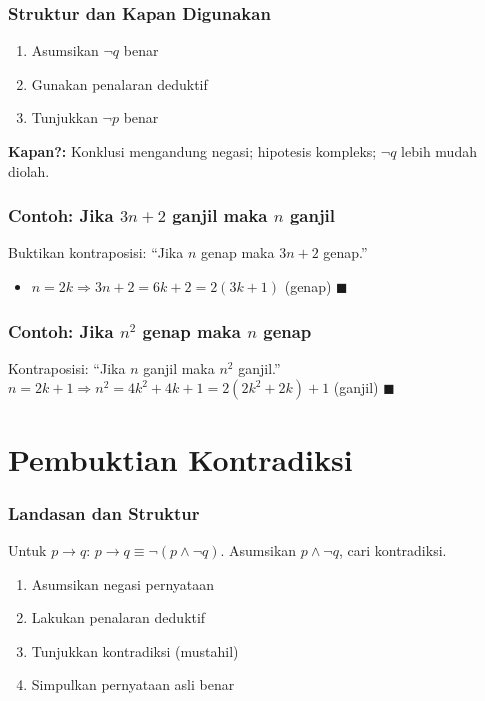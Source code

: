 \documentclass[handout]{beamer}
\theoremstyle{definition}
\theoremstyle{example}
\begin{document}
\begin{frame}
\frametitle{Struktur dan Kapan Digunakan}
\begin{enumerate}
  \item Asumsikan $\neg q$ benar
  \item Gunakan penalaran deduktif
  \item Tunjukkan $\neg p$ benar
\end{enumerate}
\textbf{Kapan?:} Konklusi mengandung negasi; hipotesis kompleks; $\neg q$ lebih mudah diolah.
\end{frame}

\begin{frame}
\frametitle{Contoh: Jika $3n+2$ ganjil maka $n$ ganjil}
Buktikan kontraposisi: ``Jika $n$ genap maka $3n+2$ genap.''
\begin{itemize}
  \item $n = 2k \Rightarrow 3n+2 = 6k+2 = 2(3k+1)$ (genap) $\blacksquare$
\end{itemize}
\end{frame}

\begin{frame}
\frametitle{Contoh: Jika $n^2$ genap maka $n$ genap}
Kontraposisi: ``Jika $n$ ganjil maka $n^2$ ganjil.''\\
$n = 2k+1 \Rightarrow n^2 = 4k^2+4k+1 = 2(2k^2+2k)+1$ (ganjil) $\blacksquare$
\end{frame}

\section{Pembuktian Kontradiksi}

\begin{frame}
\frametitle{Landasan dan Struktur}
Untuk $p \to q$: $p \to q \equiv \neg(p \wedge \neg q)$. Asumsikan $p \wedge \neg q$, cari kontradiksi.
\begin{enumerate}
  \item Asumsikan negasi pernyataan
  \item Lakukan penalaran deduktif
  \item Tunjukkan kontradiksi (mustahil)
  \item Simpulkan pernyataan asli benar
\end{enumerate}
\end{frame}
\end{document}
